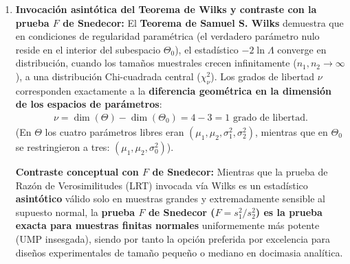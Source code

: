 \begin{solproblema}
\begin{enumerate}
		\item \textbf{Invocación asintótica del Teorema de Wilks y contraste con la prueba $F$ de Snedecor:}
		El \textbf{Teorema de Samuel S. Wilks} demuestra que en condiciones de regularidad paramétrica (el verdadero parámetro nulo reside en el interior del subespacio $\Theta_0$), el estadístico $-2\ln\Lambda$ converge en distribución, cuando los tamaños muestrales crecen infinitamente ($n_1, n_2 \to \infty$), a una distribución Chi-cuadrada central ($\chi^2_\nu$).
		Los grados de libertad $\nu$ corresponden exactamente a la \textbf{diferencia geométrica en la dimensión de los espacios de parámetros}:
		\begin{align}
			\nu = \dim(\Theta) - \dim(\Theta_0) = 4 - 3 = 1 \text{ grado de libertad.}
		\end{align}
		(En $\Theta$ los cuatro parámetros libres eran $(\mu_1, \mu_2, \sigma_1^2, \sigma_2^2)$, mientras que en $\Theta_0$ se restringieron a tres: $(\mu_1, \mu_2, \sigma_0^2)$).
		
		\textbf{Contraste conceptual con $F$ de Snedecor:} Mientras que la prueba de Razón de Verosimilitudes (LRT) invocada vía Wilks es un estadístico \textbf{asintótico} válido solo en muestras grandes y extremadamente sensible al supuesto normal, la \textbf{prueba $F$ de Snedecor ($F = s_1^2 / s_2^2$) es la prueba exacta para muestras finitas normales} uniformemente más potente (UMP insesgada), siendo por tanto la opción preferida por excelencia para diseños experimentales de tamaño pequeño o mediano en docimasia analítica.
	\end{enumerate}
\end{solproblema}

